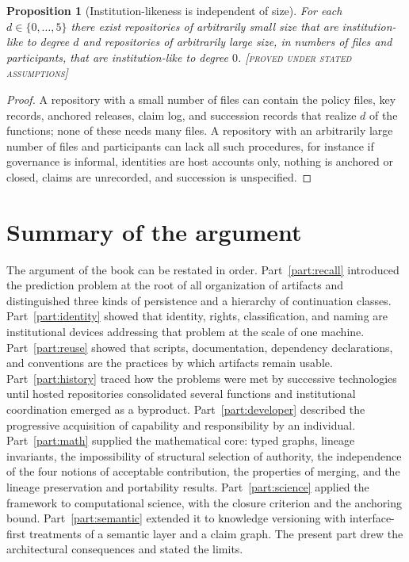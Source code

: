\documentclass[11pt,twoside,openright]{book}
\theoremstyle{plain}
\newtheorem{proposition}[theorem]{Proposition}
\theoremstyle{definition}
\theoremstyle{remark}
\newcommand{\Proved}{\textup{\textsc{[proved under stated assumptions]}}}
\begin{document}
\begin{proposition}[Institution-likeness is independent of size]\label{prop:size}
For each $d\in\{0,\dots,5\}$ there exist repositories of arbitrarily small size that are institution-like to degree $d$ and repositories of arbitrarily large size, in numbers of files and participants, that are institution-like to degree $0$.
\Proved{}
\end{proposition}

\begin{proof}
A repository with a small number of files can contain the policy files, key records, anchored releases, claim log, and succession records that realize $d$ of the functions; none of these needs many files. A repository with an arbitrarily large number of files and participants can lack all such procedures, for instance if governance is informal, identities are host accounts only, nothing is anchored or closed, claims are unrecorded, and succession is unspecified.
\end{proof}

\section{Summary of the argument}

The argument of the book can be restated in order. Part~\ref{part:recall} introduced the prediction problem at the root of all organization of artifacts and distinguished three kinds of persistence and a hierarchy of continuation classes. Part~\ref{part:identity} showed that identity, rights, classification, and naming are institutional devices addressing that problem at the scale of one machine. Part~\ref{part:reuse} showed that scripts, documentation, dependency declarations, and conventions are the practices by which artifacts remain usable. Part~\ref{part:history} traced how the problems were met by successive technologies until hosted repositories consolidated several functions and institutional coordination emerged as a byproduct. Part~\ref{part:developer} described the progressive acquisition of capability and responsibility by an individual. Part~\ref{part:math} supplied the mathematical core: typed graphs, lineage invariants, the impossibility of structural selection of authority, the independence of the four notions of acceptable contribution, the properties of merging, and the lineage preservation and portability results. Part~\ref{part:science} applied the framework to computational science, with the closure criterion and the anchoring bound. Part~\ref{part:semantic} extended it to knowledge versioning with interface-first treatments of a semantic layer and a claim graph. The present part drew the architectural consequences and stated the limits.
\end{document}
